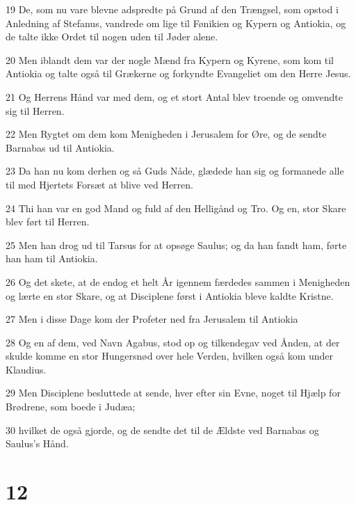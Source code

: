 \par 19 De, som nu vare blevne adspredte på Grund af den Trængsel, som opstod i Anledning af Stefanus, vandrede om lige til Fønikien og Kypern og Antiokia, og de talte ikke Ordet til nogen uden til Jøder alene.
\par 20 Men iblandt dem var der nogle Mænd fra Kypern og Kyrene, som kom til Antiokia og talte også til Grækerne og forkyndte Evangeliet om den Herre Jesus.
\par 21 Og Herrens Hånd var med dem, og et stort Antal blev troende og omvendte sig til Herren.
\par 22 Men Rygtet om dem kom Menigheden i Jerusalem for Øre, og de sendte Barnabas ud til Antiokia.
\par 23 Da han nu kom derhen og så Guds Nåde, glædede han sig og formanede alle til med Hjertets Forsæt at blive ved Herren.
\par 24 Thi han var en god Mand og fuld af den Helligånd og Tro. Og en, stor Skare blev ført til Herren.
\par 25 Men han drog ud til Tarsus for at opsøge Saulus; og da han fandt ham, førte han ham til Antiokia.
\par 26 Og det skete, at de endog et helt År igennem færdedes sammen i Menigheden og lærte en stor Skare, og at Disciplene først i Antiokia bleve kaldte Kristne.
\par 27 Men i disse Dage kom der Profeter ned fra Jerusalem til Antiokia
\par 28 Og en af dem, ved Navn Agabus, stod op og tilkendegav ved Ånden, at der skulde komme en stor Hungersnød over hele Verden, hvilken også kom under Klaudius.
\par 29 Men Disciplene besluttede at sende, hver efter sin Evne, noget til Hjælp for Brødrene, som boede i Judæa;
\par 30 hvilket de også gjorde, og de sendte det til de Ældste ved Barnabas og Saulus's Hånd.

\chapter{12}

